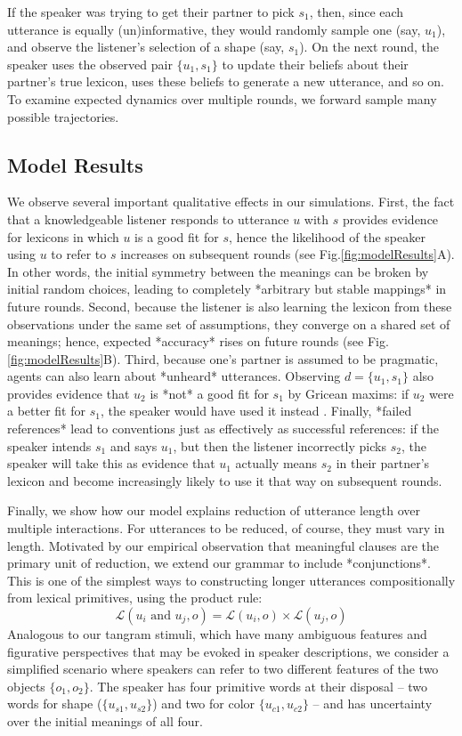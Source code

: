 If the speaker was trying to get their partner to pick $s_1$, then, since each utterance is equally (un)informative, they would randomly sample one (say, $u_1$), and observe the listener's selection of a shape (say, $s_1$). 
On the next round, the speaker uses the observed pair $\{u_1, s_1\}$ to update their beliefs about their partner's true lexicon, uses these beliefs to generate a new utterance, and so on. 
To examine expected dynamics over multiple rounds, we forward sample many possible trajectories.

\subsection{Model Results}

We observe several important qualitative effects in our simulations. 
First, the fact that a knowledgeable listener responds to utterance $u$ with $s$ provides evidence for lexicons in which $u$ is a good fit for $s$, hence the likelihood of the speaker using $u$ to refer to $s$ increases on subsequent rounds (see Fig.\ref{fig:modelResults}A). 
In other words, the initial symmetry between the meanings can be broken by initial random choices, leading to completely *arbitrary but stable mappings* in future rounds. Second, because the listener is also learning the lexicon from these observations under the same set of assumptions, they converge on a shared set of meanings; hence, expected *accuracy* rises on future rounds (see Fig. \ref{fig:modelResults}B). Third, because one's partner is assumed to be pragmatic, agents can also learn about *unheard* utterances. Observing $d = \{u_1, s_1\}$ also provides evidence that $u_2$ is *not* a good fit for $s_1$ by Gricean maxims: if $u_2$ were a better fit for $s_1$, the speaker would have used it instead \cite{Grice75_LogicConversation}. Finally, *failed references* lead to conventions just as effectively as successful references: if the speaker intends $s_1$ and says $u_1$, but then the listener incorrectly picks $s_2$, the speaker will take this as evidence that $u_1$ actually means $s_2$ in their partner's lexicon and become increasingly likely to use it that way on subsequent rounds.

Finally, we show how our model explains reduction of utterance length over multiple interactions. For utterances to be reduced, of course, they must vary in length. Motivated by our empirical observation that meaningful clauses are the primary unit of reduction, we extend our grammar to include *conjunctions*. This is one of the simplest ways to constructing longer utterances compositionally from lexical primitives, using the product rule:
$$\mathcal{L}(u_i \textrm{ and } u_j, o) = \mathcal{L}(u_i, o) \times \mathcal{L}(u_j, o)$$
\indent Analogous to our tangram stimuli, which have many ambiguous features and figurative perspectives that may be evoked in speaker descriptions, we consider a simplified scenario where speakers can refer to two different features of the two objects $\{o_1, o_2\}$. The speaker has four primitive words at their disposal -- two words for shape ($\{u_{s1}, u_{s2}\}$) and two for color $\{u_{c1}, u_{c2}\}$ -- and has uncertainty over the initial meanings of all four.

